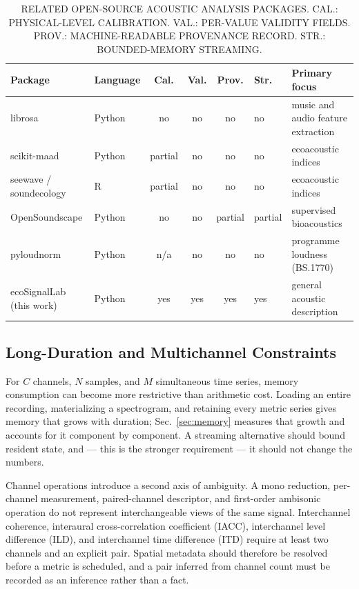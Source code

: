 \documentclass[final]{jaes}
\begin{document}
\begin{table}[t]
\caption{RELATED OPEN-SOURCE ACOUSTIC ANALYSIS PACKAGES. CAL.: PHYSICAL-LEVEL CALIBRATION. VAL.: PER-VALUE VALIDITY FIELDS. PROV.: MACHINE-READABLE PROVENANCE RECORD. STR.: BOUNDED-MEMORY STREAMING.}
\label{tab:related}
\centering
\small
\begin{tabular}{@{}llcccll@{}}
\toprule
Package & Language & Cal. & Val. & Prov. & Str. & Primary focus \\
\midrule
librosa \cite{mcfee2015} & Python & no & no & no & no & music and audio feature extraction \\
scikit-maad \cite{ulloa2021} & Python & partial & no & no & no & ecoacoustic indices \\
seewave / soundecology \cite{sueur2008} & R & partial & no & no & no & ecoacoustic indices \\
OpenSoundscape \cite{lapp2023} & Python & no & no & partial & partial & supervised bioacoustics \\
pyloudnorm \cite{steinmetz2021} & Python & n/a & no & no & no & programme loudness (BS.1770) \\
ecoSignalLab (this work) & Python & yes & yes & yes & yes & general acoustic description \\
\bottomrule
\end{tabular}
\end{table}

\subsection{Long-Duration and Multichannel Constraints}

For $C$ channels, $N$ samples, and $M$ simultaneous time series, memory consumption can become more restrictive than arithmetic cost. Loading an entire recording, materializing a spectrogram, and retaining every metric series gives memory that grows with duration; Sec.~\ref{sec:memory} measures that growth and accounts for it component by component. A streaming alternative should bound resident state, and --- this is the stronger requirement --- it should not change the numbers.

Channel operations introduce a second axis of ambiguity. A mono reduction, per-channel measurement, paired-channel descriptor, and first-order ambisonic operation do not represent interchangeable views of the same signal. Interchannel coherence, interaural cross-correlation coefficient (IACC), interchannel level difference (ILD), and interchannel time difference (ITD) require at least two channels and an explicit pair. Spatial metadata should therefore be resolved before a metric is scheduled, and a pair inferred from channel count must be recorded as an inference rather than a fact.
\end{document}
